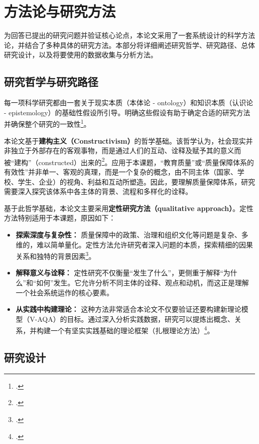 
\section{方法论与研究方法}
\label{sec:phuong_phap_luan}

为回答已提出的研究问题并验证核心论点，本论文采用了一套系统设计的科学方法论，并结合了多种具体的研究方法。本部分将详细阐述研究哲学、研究路径、总体研究设计，以及将要使用的数据收集与分析方法。

\subsection{研究哲学与研究路径}
\label{subsec:triet_ly_tiep_can}

每一项科学研究都由一套关于现实本质（本体论 - ontology）和知识本质（认识论 - epistemology）的基础性假设所引导。明确这些假设有助于确定合适的研究方法并确保整个研究的一致性\footcite{Creswell2018}。

本论文基于\textbf{建构主义（Constructivism）}的哲学基础。该哲学认为，社会现实并非独立于外部存在的客观事物，而是通过人们的互动、诠释及赋予其的意义而被“建构”（constructed）出来的\footcite{GubaLincoln1994}。应用于本课题，“教育质量”或“质量保障体系的有效性”并非单一、客观的真理，而是一个复杂的概念，由不同主体（国家、学校、学生、企业）的视角、利益和互动所塑造。因此，要理解质量保障体系，研究需要深入探究该体系中各主体的背景、流程和多样化的诠释。

基于此哲学基础，本论文主要采用\textbf{定性研究方法（qualitative approach）}。定性方法特别适用于本课题，原因如下：
\begin{itemize}
    \item \textbf{探索深度与复杂性：} 质量保障中的政策、治理和组织文化等问题是复杂、多维的，难以简单量化。定性方法允许研究者深入问题的本质，探索精细的因果关系和独特的背景因素\footcite{Yin2018}。
    \item \textbf{解释意义与诠释：} 定性研究不仅衡量“发生了什么”，更侧重于解释“为什么”和“如何”发生。它允许分析不同主体的诠释、观点和动机，而这正是理解一个社会系统运作的核心要素。
    \item \textbf{从实践中构建理论：} 这种方法非常适合本论文不仅要验证还要构建新理论模型（V-AQA）的目标。通过深入分析实践数据，研究可以提炼出概念、关系，并构建一个有坚实实践基础的理论框架（扎根理论方法）\footcite{Charmaz2006}。
\end{itemize}

\subsection{研究设计}
\label{subsec:thiet_ke_nghien_cuu}

